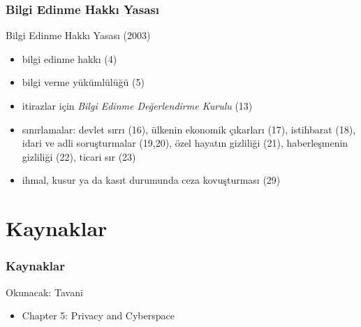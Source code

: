 \documentclass[dvipsnames]{beamer}
\theoremstyle{definition}
\theoremstyle{example}
\theoremstyle{plain}
\begin{document}
\begin{frame}
  \frametitle{Bilgi Edinme Hakkı Yasası}

  \begin{block}{Bilgi Edinme Hakkı Yasası (2003)}
    \begin{itemize}
      \item bilgi edinme hakkı (4)

      \pause
      \item bilgi verme yükümlülüğü (5)

      \pause
      \item itirazlar için \emph{Bilgi Edinme Değerlendirme Kurulu} (13)

      \pause
      \item sınırlamalar: devlet sırrı (16), ülkenin ekonomik çıkarları (17),
        istihbarat (18), idari ve adli soruşturmalar (19,20), özel hayatın
        gizliliği (21), haberleşmenin gizliliği (22), ticari sır (23)

      \pause
      \item ihmal, kusur ya da kasıt durumunda ceza kovuşturması (29)
    \end{itemize}
  \end{block}
\end{frame}

\section*{Kaynaklar}

\begin{frame}
  \frametitle{Kaynaklar}

  \begin{block}{Okunacak: Tavani}
    \begin{itemize}
      \item Chapter 5: \alert{Privacy and Cyberspace}
    \end{itemize}
  \end{block}
\end{frame}
\end{document}
